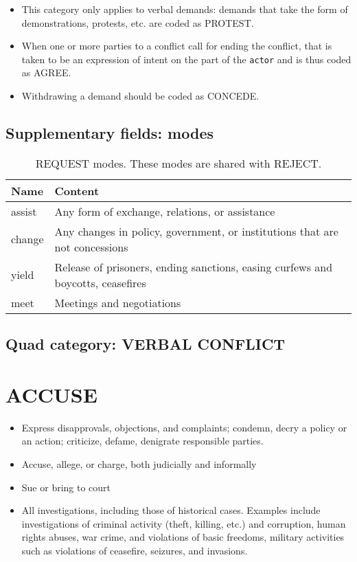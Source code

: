 \documentclass[11pt]{report}
\newcommand{\plcat}[1]{\textsf{#1}}
\newcommand{\txt}[1]{\texttt{#1}}
\begin{document}
\begin{itemize}
\item This category only applies to verbal demands: demands that take the form of demonstrations, protests, etc. are coded as \plcat{PROTEST}.
\item When one or more parties to a conflict call for ending the conflict, that is taken to be an expression of intent on the part of the \txt{actor} and is thus coded as \plcat{AGREE}.
\item Withdrawing a demand should be coded as \plcat{CONCEDE}.

\end{itemize}


\subsection{Supplementary fields: modes}


\begin{table}[htp]
\caption{REQUEST modes. These modes are shared with REJECT.}
\begin{center}
\begin{tabular}{|l|p{13cm}|}
\hline
Name & Content \\
\hline
assist & Any form of exchange, relations, or assistance\\
change & Any changes in policy, government, or institutions that are not concessions \\
yield & Release of prisoners, ending sanctions, easing curfews and boycotts, ceasefires\\
meet & Meetings and negotiations\\
\hline
\end{tabular}
\end{center}
\label{tab:requestmode2}
\end{table}%


\subsection{Quad category: VERBAL CONFLICT}

\newpage


\section{ACCUSE}

\begin{itemize}
	\item Express disapprovals, objections, and complaints; condemn, decry a policy or an action; criticize, defame, denigrate responsible parties.
	\item Accuse, allege, or charge, both judicially and informally
	\item Sue or bring to court
	\item All investigations, including those of historical cases. Examples include investigations of  criminal activity (theft, killing, etc.) and corruption, human rights abuses, war crime, and violations of basic freedoms, military activities such as violations of ceasefire, seizures, and invasions.
\end{itemize}
\end{document}
